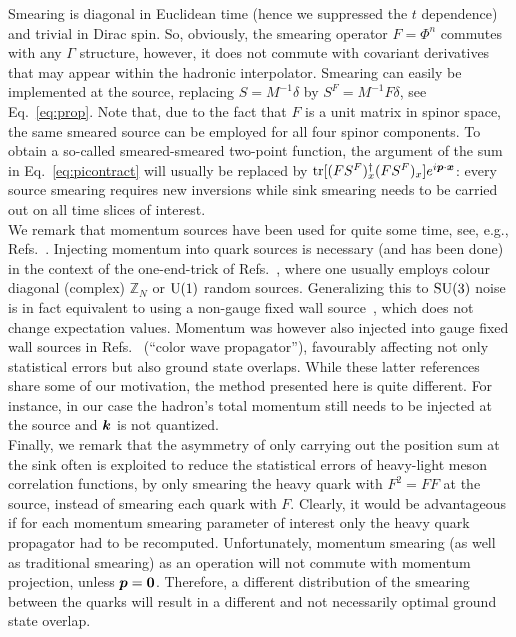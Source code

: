 Smearing is diagonal in Euclidean time (hence
we suppressed the $t$ dependence) and trivial in Dirac spin. 
So, obviously, the smearing operator $F=\Phi^n$ commutes with
any $\Gamma$ structure, however,
it does not commute with covariant derivatives that may appear
within the hadronic interpolator. 
Smearing can easily be implemented
at the source, replacing $S=M^{-1}\delta$
by $S^F=M^{-1}F\delta$, see Eq.~\eqref{eq:prop}.
Note that, due to the fact that
$F$ is a unit matrix in spinor space, 
the same smeared source can be employed for all four
spinor components.
To obtain a so-called
smeared-smeared two-point function, the argument of the sum
in Eq.~\eqref{eq:picontract} will usually be replaced by
$\mathop{\textmd{tr}}\nolimits[(FS^{F})^{\dagger}_{x}(FS^{F})_{x}]e^{i\boldsymbol{p}\cdot\boldsymbol{x}}$:
every source smearing requires new inversions while
sink smearing needs to be carried out on all time slices
of interest.\\

We remark that momentum sources have been used for quite some time, see, e.g.,
Refs.~\cite{Gockeler:1998ye,Brown:2012tm,Bali:2015msa}.
Injecting momentum into quark sources is
necessary (and has been done) in the context
of the one-end-trick of Refs.~\cite{Sommer:1994gg,Foster:1998wu},
where one usually employs colour diagonal (complex) $\mathbb{Z}_N$ or
$\textmd{U}(1)$ random sources. Generalizing this
to $\textmd{SU}(3)$ noise is in fact equivalent to using a non-gauge fixed
wall source~\cite{Billoire:1985yn}, which does not change expectation
values. Momentum was however also injected into gauge fixed wall sources
in Refs.~\cite{Detmold:2012wc,Basak:2012py}
(``color wave propagator''), favourably affecting not only
statistical errors but also ground state overlaps. While these latter
references share some of our motivation, the method presented
here is quite different. For instance, in our case
the hadron's total momentum still needs
to be injected at the source and $\boldsymbol{k}$ is not quantized.\\

Finally, we remark that the asymmetry of only carrying
out the position sum at the sink often is exploited
to reduce the statistical errors of heavy-light meson
correlation functions, by only smearing the heavy quark with
$F^2=FF$ at the source, instead of smearing each quark with $F$.
Clearly, it would be advantageous if for each momentum
smearing parameter of interest only the heavy quark propagator had
to be recomputed. Unfortunately, momentum smearing (as well as
traditional smearing) as
an operation will not commute with momentum projection, unless
$\boldsymbol{p}=\boldsymbol{0}$. Therefore, a different distribution of the smearing
between the quarks will result in a different
and not necessarily optimal ground state overlap.

